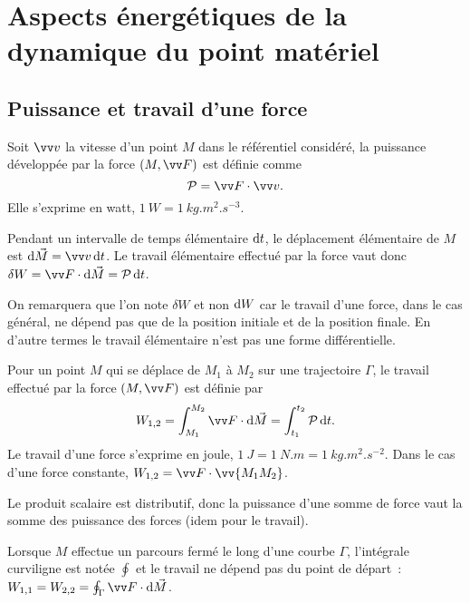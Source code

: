 \chapter{Aspects énergétiques de la dynamique du point matériel}
\label{chap:aspectenergetiques}
\minitoc
\minilof
\minilot

\section{Puissance et travail d'une force}
\label{chap4-sec:puissanceettravail}

\begin{defdef}[Puissance]
  Soit $\vvv$ la vitesse d'un point $M$ dans le référentiel considéré, la puissance développée par la force $(M, \vF)$ est définie comme
  \begin{equation}
    \P=\vF \cdot \vvv.
  \end{equation}
  Elle s'exprime en watt, $\SI{1}{W}=\SI{1}{kg.m^2.s^{-3}}$.
\end{defdef}
 Pendant un intervalle de temps élémentaire $\mathop{}\mathopen{}\mathrm{d} t$, le déplacement élémentaire de $M$ est $\diff \vec{M} = \vvv \diff t$. Le travail élémentaire effectué par la force vaut donc $\delta W = \vF \cdot \diff \vec{M} = \P \diff t$.

On remarquera que l'on note $\delta W$ et non $\mathop{}\mathopen{}\mathrm{d} W$ car le travail d'une force, dans le cas général, ne dépend pas que de la position initiale et de la position finale. En d'autre termes le travail élémentaire n'est pas une forme différentielle.
\begin{defdef}[Travail]
  Pour un point $M$ qui se déplace de $M_1$ à $M_2$ sur une trajectoire $\Gamma$, le travail effectué par la force $(M, \vF)$ est définie par
\begin{equation}
  W_{1, 2} = \int_{M_1}^{M_2} \vF \cdot \diff \vec{M} = \int_{t_1}^{t_2} \P \diff t.
\end{equation}
Le travail d'une force s'exprime en joule, $\SI{1}{J}=\SI{1}{N.m}=\SI{1}{kg.m^2.s^{-2}}$. Dans le cas d'une force constante, $W_{1, 2}=\vF \cdot \vv{M_1M_2}$.
\end{defdef}
 Le produit scalaire est distributif, donc la puissance d'une somme de force vaut la somme des puissance des forces (idem pour le travail).

Lorsque $M$ effectue un parcours fermé le long d'une courbe $\Gamma$, l'intégrale curviligne est notée $\oint$ et le travail ne dépend pas du point de départ~: $W_{1,1} = W_{2,2} = \oint_\Gamma \vF \cdot \diff \vec{M}$.

